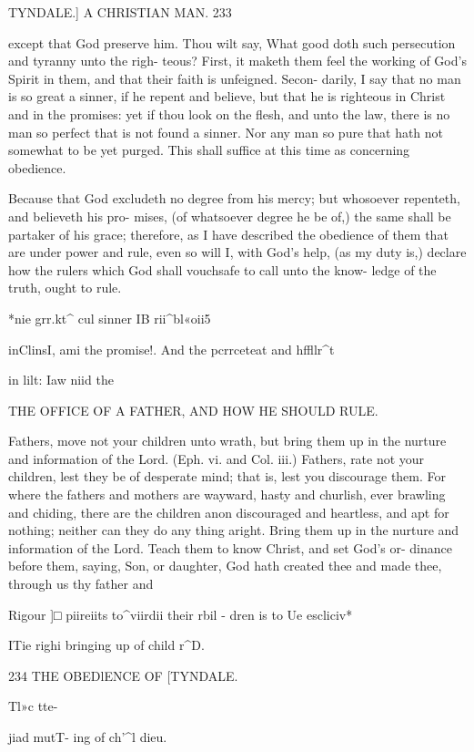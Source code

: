 \documentclass{custom}
\begin{document}
{TYNDALE.]
A CHRISTIAN MAN.
233

except that God preserve him. Thou wilt say, What 
good doth such persecution and tyranny unto the righ-
teous? First, it maketh them feel the working of God's 
Spirit in them, and that their faith is unfeigned. Secon- 
darily, I say that no man is so great a sinner, if he repent 
and believe, but that he is righteous in Christ and in the 
promises: yet if thou look on the flesh, and unto the law, 
there is no man so perfect that is not found a sinner. Nor 
any man so pure that hath not somewhat to be yet purged.
This shall suffice at this time as concerning obedience. 

Because that God excludeth no degree from his 
mercy; but whosoever repenteth, and believeth his pro- 
mises, (of whatsoever degree he be of,) the same shall be 
partaker of his grace; therefore, as I have described the 
obedience of them that are under power and rule, even so 
will I, with God's help, (as my duty is,) declare how the 
rulers which God shall vouchsafe to call unto the know- 
ledge of the truth, ought to rule. 

*nie grr.kt^ 
cul sinner 
IB rii^bl«oii5 

inClinsI, 
ami the 
promise!. 
And the 
pcrrceteat 
and hffllr^t 

in lilt: Iaw 
niid the 


THE OFFICE OF A FATHER, AND HOW HE 
SHOULD RULE. 

Fathers, move not your children unto wrath, but 
bring them up in the nurture and information of the 
Lord. (Eph. vi. and Col. iii.) Fathers, rate not your 
children, lest they be of desperate mind; that is, lest you 
discourage them. For where the fathers and mothers are 
wayward, hasty and churlish, ever brawling and chiding, 
there are the children anon discouraged and heartless, and 
apt for nothing; neither can they do any thing aright. 
Bring them up in the nurture and information of the 
Lord. Teach them to know Christ, and set God's or- 
dinance before them, saying, Son, or daughter, God hath 
created thee and made thee, through us thy father and 

Rigour ]□ 
piireiits 
to^viirdii 
their rbil - 
dren is to 
Ue escliciv* 

ITie righi 
bringing up 
of child r^D. 


234
THE OBEDlENCE OF
[TYNDALE.

Tl»c tte- 

jiad mutT- 
ing of ch'^l 
dieu. 

}
\end{document}
